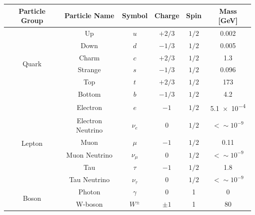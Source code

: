 \vspace{-0.5em}
  {\renewcommand{\arraystretch}{1.2}
  \begin{table}[!ht]
  \begin{center}
    \begin{tabular}{|c|c||c|c|c|c|}
      \hline
    Particle Group          & Particle Name   & Symbol        & Charge  &  Spin  &  Mass [GeV]\\
    \hline
    \multirow{6}{*}{Quark}  &Up            &   $u$  &  $+2/3$   &  $1/2$  &  0.002\\
                            &Down          &   $d$  &  $-1/3$   &  $1 / 2$  &  0.005\\
                            \cline{2-6}                                            
                            &Charm         &   $c$  &  $+2/3$   &  $1 / 2$  &  1.3 \\
                            &Strange       &   $s$  &  $-1/3$   &  $1 / 2$  &  0.096 \\
                            \cline{2-6}                                                      
                            &Top           &   $t$  &  $+2/3$   &  $1 / 2$  &  173  \\
                            &Bottom        &   $b$  &  $-1/3$   &  $1 / 2$  &  4.2  \\
    \hline                  
    \multirow{6}{*}{Lepton} &Electron          &   $e$         &  $-1$    &  $1 / 2$   &  \num{5.1e-4}\\
                            &Electron Neutrino &   $\nu_e$     &  0     &  $1 / 2$   &  $\lt \sim 10^{-9}$\\
                            \cline{2-6}                                   
                            &Muon              &   $\mu$       &  $-1$    &  $1 / 2$   &  0.11 \\
                            &Muon Neutrino     &   $\nu_{\mu}$  &  0     &  $1 / 2$     &  $\lt \sim 10^{-9}$\\
                            \cline{2-6}                                      
                            &Tau               &   $\tau$       &  $-1$   &  $1 / 2$   &  1.8\\
                            &Tau Neutrino      &   $\nu_{\tau}$  &  0    &  $1 / 2$     &  $\lt \sim 10^{-9}$\\
    \hline
    \multirow{5}{*}{Boson}  &Photon           &   $\gamma$    &  0      &  1     &  0 \\
                            &W-boson          &   $W^{\pm}$    & $\pm1$  &  1     &  80 \\

\end{tabular}
\end{center}
\end{table}}
